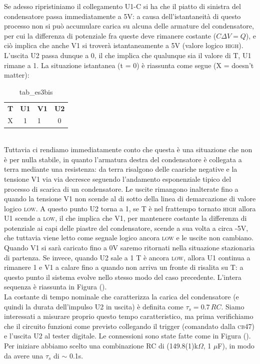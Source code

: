 \documentclass[journal, a4paper]{IEEEtran}
\begin{document}
Se adesso ripristiniamo il collegamento U1-C si ha che il piatto di sinistra del condensatore passa immediatamente a 5V: a causa dell'istantaneità di questo processo non si può accumulare carica su alcuna delle armature del condensatore, per cui la differenza di potenziale fra queste deve rimanere costante ($C \Delta V = Q$), e ciò implica che anche V1 si troverà istantaneamente a 5V (valore logico \textsc{high}). L'uscita U2 passa dunque a 0, il che implica che qualunque sia il valore di T, U1 rimane a 1. La situazione istantanea (t = 0) è riassunta come segue (X = doesn't matter):\\

\begin{table}
\centering
\caption{tab\_es3bis}
\label{tab:es3bis}
\begin{tabular}{c|cl|c}
  \hline
  \textbf{T} & \textbf{U1} & \textbf{V1} & \textbf{U2} \\
  X & 1 & 1 & 0
\end{tabular}
\end{table}
~\\

Tuttavia ci rendiamo immediatamente conto che questa è una situazione che non è per nulla stabile, in quanto l'armatura destra del condensatore è collegata a terra mediante una resistenza: da terra risalgono delle caariche negative e la tensione V1 via via decresce seguendo l'andamento esponenziale tipico del processo di scarica di un condensatore. Le uscite rimangono inalterate fino a quando la tensione V1 non scende al di sotto della linea di demarcazione di valore logico \textsc{low}. A questo punto U2 torna a 1, se T è nel frattempo tornato \textsc{high} allora U1 scende a \textsc{low}, il che implica che V1, per mantenere costante la differenza di potenziale ai capi delle piastre del condensatore, scende a sua volta a circa -5V, che tuttavia viene letto come segnale logico ancora \textsc{low} e le uscite non cambiano. Quando V1 si sarà caricato fino a 0V saremo ritornati nella situazione stazionaria di partenza. Se invece, quando U2 sale a 1 T è ancora \textsc{low}, allora U1 continua a rimanere 1 e V1 a calare fino a quando non arriva un fronte di risalita su T: a questo punto il sistema evolve nello stesso modo del caso precedente. L'intera sequenza è riassunta in Figura ().\\


La costante di tempo nominale che caratterizza la carica del condensatore (e quindi la durata dell'impulso U2 in uscita) è definita come $\tau_s = 0.7 \, RC$. Siamo interessati a misurare proprio questo tempo caratteristico, ma prima verifichiamo che il circuito funzioni come previsto collegando il trigger (comandato dalla \textsc{cb47}) e l'uscita U2 al tester digitale. Le connessioni sono state fatte come in Figura (). Per iniziare abbiamo scelto una combinazione RC di (149.8(1)k$\Omega$, 1 $\mu$F), in modo da avere una $\tau_s$ di $\sim$ 0.1s.\\
\end{document}
